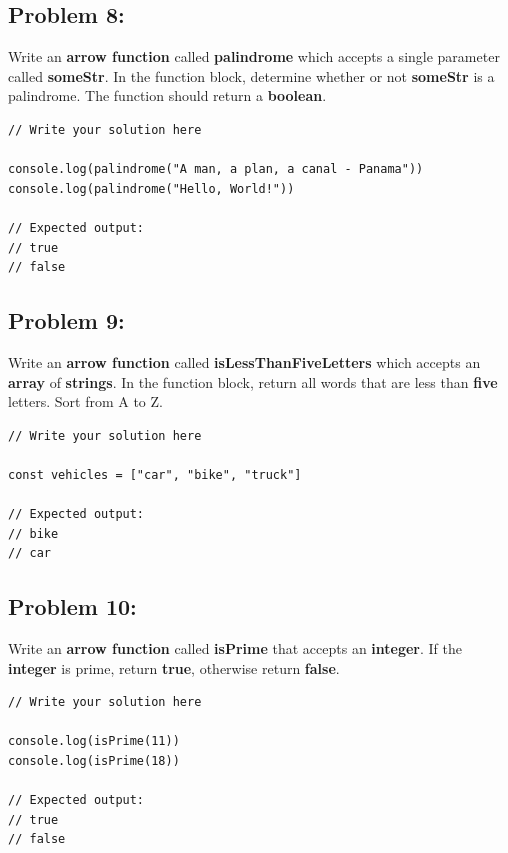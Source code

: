 \documentclass{article}
\begin{document}
\subsection*{Problem 8:}
Write an \textbf{arrow function} called \textbf{palindrome} which accepts a single parameter called \textbf{someStr}. In the function block, determine whether or not \textbf{someStr} is a palindrome. The function should return a \textbf{boolean}.

\begin{verbatim}
// Write your solution here

console.log(palindrome("A man, a plan, a canal - Panama"))
console.log(palindrome("Hello, World!"))

// Expected output:
// true
// false
\end{verbatim}
 
\subsection*{Problem 9:}
Write an \textbf{arrow function} called \textbf{isLessThanFiveLetters} which accepts an \textbf{array} of \textbf{strings}. In the function block, return all words that are less than \textbf{five} letters. Sort from A to Z.

\begin{verbatim} 
// Write your solution here

const vehicles = ["car", "bike", "truck"]

// Expected output:
// bike
// car
\end{verbatim}

\subsection*{Problem 10:}
Write an \textbf{arrow function} called \textbf{isPrime} that accepts an \textbf{integer}. If the \textbf{integer} is prime, return \textbf{true}, otherwise return \textbf{false}. 

\begin{verbatim}
// Write your solution here

console.log(isPrime(11))
console.log(isPrime(18))

// Expected output: 
// true
// false
\end{verbatim}
\end{document}
